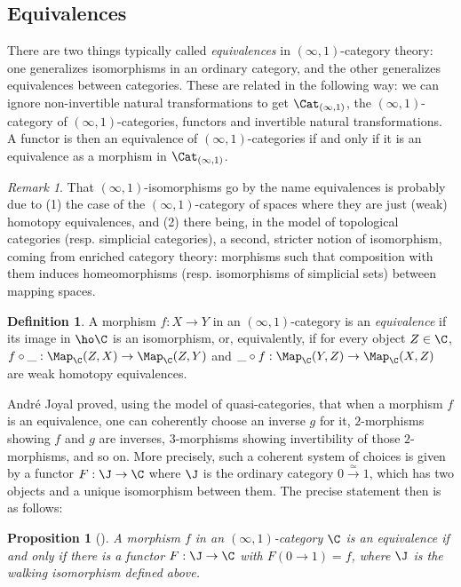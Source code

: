 \documentclass[12pt]{amsart}
\newtheorem{proposition}[theorem]{Proposition}
\theoremstyle{definition} \newtheorem{definition}[theorem]{Definition}
\theoremstyle{remark} \newtheorem{remark}[theorem]{Remark}
\numberwithin{equation}{section}
\newcommand{\oo}{\infty}
\newcommand{\io}{$(\oo,1)$}
\newcommand{\Catio}{\Cat_{(\oo,1)}}
\begin{document}
\subsection{Equivalences}

There are two things typically called \emph{equivalences} in
\io-category theory: one generalizes isomorphisms in an ordinary
category, and the other generalizes equivalences between categories.
These are related in the following way: we can ignore
non-invertible natural transformations to get $\Catio$, the
\io-category of \io-categories, functors and invertible natural
transformations. A functor is then an equivalence of \io-categories
if and only if it is an equivalence as a morphism in $\Catio$.

\begin{remark}
  That \io-isomorphisms go by the name equivalences is probably due
  to (1) the case of the \io-category of spaces where they are just
  (weak) homotopy equivalences, and (2) there being, in the model of
  topological categories (resp. simplicial categories), a second, stricter
  notion of isomorphism, coming from enriched category theory:
  morphisms such that composition with them induces homeomorphisms
  (resp. isomorphisms of simplicial sets) between mapping spaces.
\end{remark}

\begin{definition}
  A morphism $f : X \to Y$ in an \io-category is an \emph{equivalence}
  if its image in $\ho\C$ is an isomorphism, or, equivalently, if for
  every object $Z \in \C$, $f \circ \_ : \Map_\C(Z,X) \to \Map_\C(Z,Y)$
  and $\_ \circ f : \Map_\C(Y,Z) \to \Map_\C(X,Z)$ are weak homotopy
  equivalences.
\end{definition}

Andr\'{e} Joyal proved, using the model of quasi-categories, that when
a morphism $f$ is an equivalence, one can coherently choose an inverse
$g$ for it, $2$-morphisms showing $f$ and $g$ are inverses, $3$-morphisms
showing invertibility of those $2$-morphisms, and so on. More precisely,
such a coherent system of choices is given by a functor $F : \J \to \C$
where $\J$ is the ordinary category $0 \xrightarrow{\simeq} 1$,
which has two objects and a unique isomorphism between them. The precise
statement then is as follows:

\begin{proposition}[{\cite[Corollary 1.6]{JoyalPub}}]
  A morphism $f$ in an \io-category $\C$ is an equivalence if and only
  if there is a functor $F : \J \to \C$ with $F(0 \to 1) = f$, where
  $\J$ is the \emph{walking isomorphism} defined above.
\end{proposition}
\end{document}
